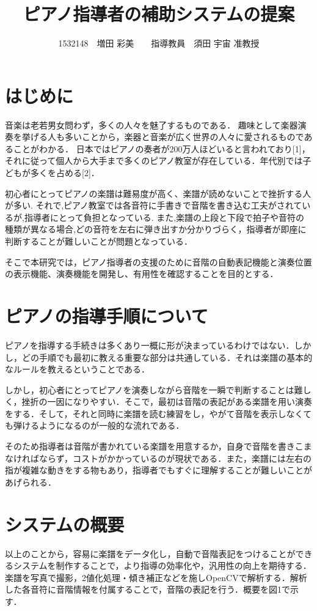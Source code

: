 \documentclass[twocolumn,10pt,a4j]{jsarticle}
\title{ピアノ指導者の補助システムの提案}
\author{1532148　増田 彩美　　指導教員　須田 宇宙 准教授}
\date{}
\begin{document}
\maketitle

\section{はじめに}

音楽は老若男女問わず，多くの人々を魅了するものである．
趣味として楽器演奏を挙げる人も多いことから，楽器と音楽が広く世界の人々に愛されるものであることがわかる．
日本ではピアノの奏者が200万人ほどいると言われており[1]，それに従って個人から大手まで多くのピアノ教室が存在している．年代別では子どもが多くを占める[2]．

初心者にとってピアノの楽譜は難易度が高く、楽譜が読めないことで挫折する人が多い.
それで,ピアノ教室では各音符に手書きで音階を書き込む工夫がされているが,指導者にとって負担となっている.
また,楽譜の上段と下段で拍子や音符の種類が異なる場合,どの音符を左右に弾き出すか分かりづらく，指導者が即座に判断することが難しいことが問題となっている．

そこで本研究では，ピアノ指導者の支援のために音階の自動表記機能と演奏位置の表示機能、演奏機能を開発し、有用性を確認することを目的とする．


\section{ピアノの指導手順について}
ピアノを指導する手続きは多くあり一概に形が決まっているわけではない．しかし，どの手順でも最初に教える重要な部分は共通している．それは楽譜の基本的なルールを教えるということである．

しかし，初心者にとってピアノを演奏しながら音階を一瞬で判断することは難しく，挫折の一因になりやすい．そこで，最初は音階の表記がある楽譜を用い演奏をする．そして，それと同時に楽譜を読む練習をし，やがて音階を表示しなくても弾けるようになるのが一般的な流れである．

そのため指導者は音階が書かれている楽譜を用意するか，自身で音階を書きこまなければならず，コストがかかっているのが現状である．また，楽譜には左右の指が複雑な動きをする物もあり，指導者でもすぐに理解することが難しいことがあげられる．


\section{システムの概要}
以上のことから，容易に楽譜をデータ化し，自動で音階表記をつけることができるシステムを制作することで，より指導の効率化や，汎用性の向上を期待する．
楽譜を写真で撮影，2値化処理・傾き補正などを施しOpenCVで解析する．解析した各音符に音階情報を付属することで，音階の表記を行う．概要を図1で示す．
\end{document}
